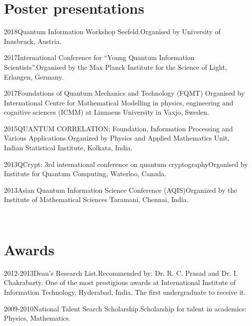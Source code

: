 \documentclass{tccv}
\begin{document}
\section{Poster presentations}

\begin{yearlist}
\item{2018}{Quantum Information Workshop Seefeld.}{Organised by University of Innsbruck, Austria.}
\item{2017}{International Conference for “Young Quantum Information Scientists”.}{Organised by the Max Planck Institute for the Science of Light, Erlangen, Germany.}
\item{2017}{Foundations of Quantum Mechanics and Technology (FQMT)}
{Organised by International Centre for Mathematical Modelling in physics, engineering and cognitive sciences (ICMM) at Linnaeus University in Vaxjo, Sweden.}
\item{2015}{QUANTUM CORRELATION; Foundation, Information Processing and Various Applications.}{Organized by Physics and Applied Mathematics Unit, Indian Statistical Institute, Kolkata, India.}
\item{2013}{QCrypt: 3rd international conference on quantum cryptography}{Organised by Institute for Quantum Computing, Waterloo, Canada.}
\item{2013}{Asian Quantum Information Science Conference (AQIS)}{Organized
by the Institute of Mathematical Sciences Taramani, Chennai, India.
}
\end{yearlist}



\\
\vspace{4in}
\section{Awards}

\begin{yearlist}

\item{2012-2013}{Dean's Research List.}{Recommended by: Dr. R. C. Prasad and Dr. I. Chakrabarty. One of the most prestigious awards at International Institute of Information Technology, Hyderabad, India. The first undergraduate to receive it.}
\item{2009-2010}{National Talent Search Scholarship.}{Scholarship for talent in academics: Physics, Mathematics.}

\end{yearlist}
\end{document}
